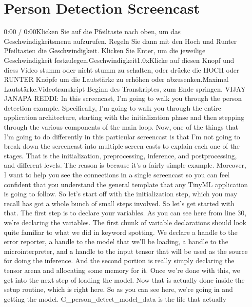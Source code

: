 \section{Person Detection Screencast}

    0:00 / 0:00Klicken Sie auf die Pfeiltaste nach oben, um das Geschwindigkeitsmenu aufzurufen. Regeln Sie dann mit den Hoch und Runter Pfeiltasten die Geschwindigkeit. Klicken Sie Enter, um die jeweilige Geschwindigkeit festzulegen.Geschwindigkeit1.0xKlicke auf diesen Knopf und diess Video stumm oder nicht stumm zu schalten, oder drücke die HOCH oder RUNTER Knöpfe um die Lautstärke zu erhöhen oder abzusenken.Maximal Lautstärke.Videotranskript
    Beginn des Transkriptes, zum Ende springen.
    VIJAY JANAPA REDDI: In this screencast, I'm
    going to walk you through the person detection example.
    Specifically, I'm going to walk you through the entire application
    architecture, starting with the initialization phase
    and then stepping through the various components of the main loop.
    Now, one of the things that I'm going to do differently
    in this particular screencast is that I'm not going to break down
    the screencast into multiple screen casts
    to explain each one of the stages.
    That is the initialization, preprocessing, inference,
    and postprocessing, and different levels.
    The reason is because it's a fairly simple example.
    Moreover, I want to help you see the connections in a single screencast
    so you can feel confident that you understand
    the general template that any TinyML application is going to follow.
    So let's start off with the initialization step,
    which you may recall has got a whole bunch of small steps involved.
    So let's get started with that.
    The first step is to declare your variables.
    As you can see here from line 30, we're declaring the variables.
    The first chunk of variable declarations should
    look quite familiar to what we did in keyword spotting.
    We declare a handle to the error reporter,
    a handle to the model that we'll be loading,
    a handle to the microinterpreter, and a handle to the input
    tensor that will be used as the source for doing the inference.
    And the second portion is really simply declaring the tensor arena
    and allocating some memory for it.
    Once we're done with this, we get into the next step of loading the model.
    Now that is actually done inside the setup routine, which is right here.
    So as you can see here, we're going in and getting the model.
    G\_person\_detect\_model\_data is the file that actually
